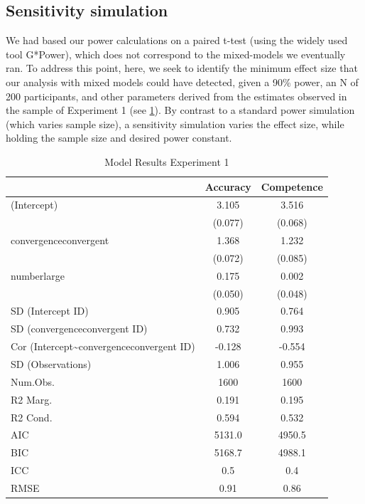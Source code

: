 \documentclass[
  doc,floatsintext]{apa6}
\begin{document}
\subsection{Sensitivity simulation}\label{sensitivity-simulation}

We had based our power calculations on a paired t-test (using the widely used tool G*Power), which does not correspond to the mixed-models we eventually ran. To address this point, here, we seek to identify the minimum effect size that our analysis with mixed models could have detected, given a 90\% power, an N of 200 participants, and other parameters derived from the estimates observed in the sample of Experiment 1 (see \ref{tab:exp1-regression-table}). By contrast to a standard power simulation (which varies sample size), a sensitivity simulation varies the effect size, while holding the sample size and desired power constant.

\begin{table}
\centering
\caption{\label{tab:exp1-regression-table}Model Results Experiment 1}
\centering
\begin{tabular}[t]{lcc}
\toprule
  & Accuracy & Competence\\
\midrule
(Intercept) & 3.105 & 3.516\\
 & (0.077) & (0.068)\\
convergenceconvergent & 1.368 & 1.232\\
 & (0.072) & (0.085)\\
numberlarge & 0.175 & 0.002\\
 & (0.050) & (0.048)\\
SD (Intercept ID) & 0.905 & 0.764\\
SD (convergenceconvergent ID) & 0.732 & 0.993\\
Cor (Intercept\textasciitilde{}convergenceconvergent ID) & -0.128 & -0.554\\
SD (Observations) & 1.006 & 0.955\\
\midrule
Num.Obs. & 1600 & 1600\\
R2 Marg. & 0.191 & 0.195\\
R2 Cond. & 0.594 & 0.532\\
AIC & 5131.0 & 4950.5\\
BIC & 5168.7 & 4988.1\\
ICC & 0.5 & 0.4\\
RMSE & 0.91 & 0.86\\
\bottomrule
\end{tabular}
\end{table}
\end{document}
